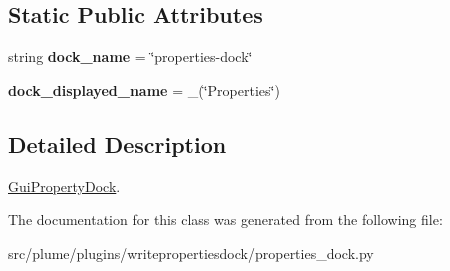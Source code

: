 \subsection*{Static Public Attributes}
\begin{DoxyCompactItemize}
\item 
string {\bfseries dock\+\_\+name} = \char`\"{}properties-\/dock\char`\"{}\hypertarget{classplume-creator_1_1src_1_1plume_1_1plugins_1_1writepropertiesdock_1_1properties__dock_1_1_gui_property_dock_a5fa8b1eddef80229cf4a1a5c5ba158e5}{}\label{classplume-creator_1_1src_1_1plume_1_1plugins_1_1writepropertiesdock_1_1properties__dock_1_1_gui_property_dock_a5fa8b1eddef80229cf4a1a5c5ba158e5}

\item 
{\bfseries dock\+\_\+displayed\+\_\+name} = \+\_\+(\char`\"{}Properties\char`\"{})\hypertarget{classplume-creator_1_1src_1_1plume_1_1plugins_1_1writepropertiesdock_1_1properties__dock_1_1_gui_property_dock_ad187827c906943496fda0d006b176569}{}\label{classplume-creator_1_1src_1_1plume_1_1plugins_1_1writepropertiesdock_1_1properties__dock_1_1_gui_property_dock_ad187827c906943496fda0d006b176569}

\end{DoxyCompactItemize}


\subsection{Detailed Description}
\hyperlink{classplume-creator_1_1src_1_1plume_1_1plugins_1_1writepropertiesdock_1_1properties__dock_1_1_gui_property_dock}{Gui\+Property\+Dock}. 

The documentation for this class was generated from the following file\+:\begin{DoxyCompactItemize}
\item 
src/plume/plugins/writepropertiesdock/properties\+\_\+dock.\+py\end{DoxyCompactItemize}
